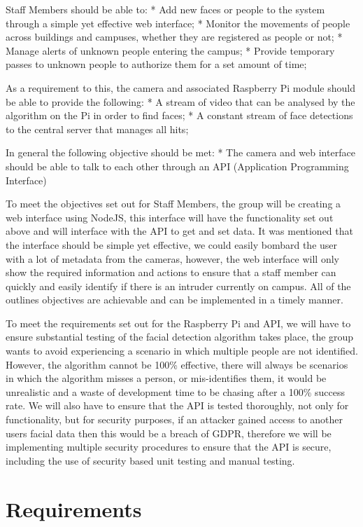 \documentclass[
  english,
  a4paper,
,tablecaptionabove
]{scrartcl}
\begin{document}
Staff Members should be able to: * Add new faces or people to the system
through a simple yet effective web interface; * Monitor the movements of
people across buildings and campuses, whether they are registered as
people or not; * Manage alerts of unknown people entering the campus; *
Provide temporary passes to unknown people to authorize them for a set
amount of time;

As a requirement to this, the camera and associated Raspberry Pi module
should be able to provide the following: * A stream of video that can be
analysed by the algorithm on the Pi in order to find faces; * A constant
stream of face detections to the central server that manages all hits;

In general the following objective should be met: * The camera and web
interface should be able to talk to each other through an API
(Application Programming Interface)

To meet the objectives set out for Staff Members, the group will be
creating a web interface using NodeJS, this interface will have the
functionality set out above and will interface with the API to get and
set data. It was mentioned that the interface should be simple yet
effective, we could easily bombard the user with a lot of metadata from
the cameras, however, the web interface will only show the required
information and actions to ensure that a staff member can quickly and
easily identify if there is an intruder currently on campus. All of the
outlines objectives are achievable and can be implemented in a timely
manner.

To meet the requirements set out for the Raspberry Pi and API, we will
have to ensure substantial testing of the facial detection algorithm
takes place, the group wants to avoid experiencing a scenario in which
multiple people are not identified. However, the algorithm cannot be
100\% effective, there will always be scenarios in which the algorithm
misses a person, or mis-identifies them, it would be unrealistic and a
waste of development time to be chasing after a 100\% success rate. We
will also have to ensure that the API is tested thoroughly, not only for
functionality, but for security purposes, if an attacker gained access
to another users facial data then this would be a breach of GDPR,
therefore we will be implementing multiple security procedures to ensure
that the API is secure, including the use of security based unit testing
and manual testing.

\hypertarget{requirements}{%
\section{Requirements}\label{requirements}}
\end{document}
